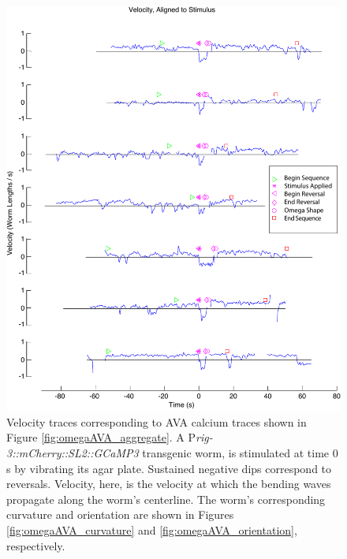 \begin{figure}  %
\includegraphics[width=\textwidth]{figures/omegaAVA_velocity}
\caption[Corresponding velocity for seven sequences from four worms.]{Velocity traces corresponding to AVA calcium traces shown in Figure \ref{fig:omegaAVA_aggregate}. A P\textit{rig-3::mCherry::SL2::GCaMP3} transgenic worm, is stimulated at time 0 s by vibrating its agar plate. Sustained negative dips correspond to reversals. Velocity, here, is the velocity at which the bending waves propagate along the worm's centerline.  The worm's corresponding curvature and orientation are shown in Figures \ref{fig:omegaAVA_curvature} and \ref{fig:omegaAVA_orientation}, respectively. \label{fig:omegaAVA_velocity}}
\end{figure}



